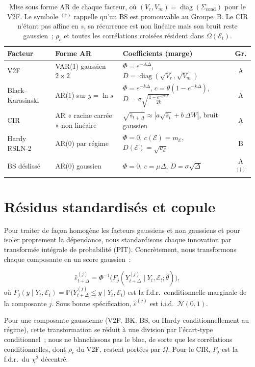 \documentclass[11pt,a4paper]{article}
\theoremstyle{definition}
\DeclareMathOperator{\diag}{diag}
\newcommand{\Prob}{\mathbb{P}}
\newcommand{\Ecal}{\mathcal{E}}
\newcommand{\Ncal}{\mathcal{N}}
\newcommand{\eps}{\varepsilon}
\newcommand{\Dt}{\Delta}
\begin{document}
\begin{table}[H]
\centering\small\renewcommand{\arraystretch}{1.4}
\begin{tabularx}{\textwidth}{@{}l l X c@{}}
\toprule
\textbf{Facteur} & \textbf{Forme AR} & \textbf{Coefficients (marge)} & \textbf{Gr.}\\
\midrule
V2F & VAR(1) gaussien $2{\times}2$ & $\Phi=e^{-A\Dt}$, $D=\diag(\sqrt{V_r},\sqrt{V_m})$ & A\\
Black--Karasinski & AR(1) sur $y=\ln s$ & $\Phi=e^{-k\Dt}$, $c=\theta(1-e^{-k\Dt})$, $D=\sigma\sqrt{\tfrac{1-e^{-2k\Dt}}{2k}}$ & A\\
CIR & AR « racine carrée » non linéaire & $\sqrt{\bar s_{t+\Dt}}\approx|a\sqrt{\bar s_t}+b\,\Dt W|$, bruit gaussien & A\\
Hardy RSLN-2 & AR(0) par régime & $\Phi=0$, $c(\Ecal)=m_\Ecal$, $D(\Ecal)=\sqrt{v_\Ecal}$ & B\\
BS déslissé & AR(0) gaussien & $\Phi=0$, $c=\mu\Dt$, $D=\sigma\sqrt{\Dt}$ & A$^{(\dagger)}$\\
\bottomrule
\end{tabularx}
\caption{Mise sous forme AR de chaque facteur, où $(V_r,V_m)=\diag(\Sigma_{\mathrm{cond}})$ pour le V2F. Le symbole $^{(\dagger)}$ rappelle qu'un BS est promouvable au Groupe~B. Le CIR n'étant pas affine en $s$, sa récurrence est non linéaire mais son bruit reste gaussien~; $\rho_c$ et toutes les corrélations croisées résident dans $\Omega(\Ecal_t)$.}
\label{tab:formes}
\end{table}

\section{Résidus standardisés et copule}
\label{sec:pit}
Pour traiter de façon homogène les facteurs gaussiens et non gaussiens et pour isoler proprement la dépendance, nous standardisons chaque innovation par transformée intégrale de probabilité (PIT). Concrètement, nous transformons chaque composante en un score gaussien~:
\begin{definitionbox}
\[
\widehat\eps^{(j)}_{t+\Dt}=\Phi^{-1}\big(F_j(Y^{(j)}_{t+\Dt}\mid Y_t,\Ecal_t;\hat\theta)\big),
\]
où $F_j(y\mid Y_t,\Ecal_t)=\Prob\big(Y^{(j)}_{t+\Dt}\le y\mid Y_t,\Ecal_t\big)$ est la f.d.r.\ conditionnelle marginale de la composante $j$. Sous bonne spécification, $\widehat\eps^{(j)}$ est i.i.d.\ $\Ncal(0,1)$.
\end{definitionbox}
\noindent Pour une composante gaussienne (V2F, BK, BS, ou Hardy conditionnellement au régime), cette transformation se réduit à une division par l'écart-type conditionnel~; nous ne blanchissons pas le bloc, de sorte que les corrélations conditionnelles, dont $\rho_c$ du V2F, restent portées par $\Omega$. Pour le CIR, $F_j$ est la f.d.r.\ du $\chi^2$ décentré.
\end{document}
